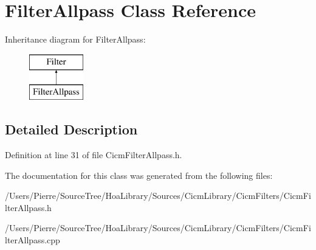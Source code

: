 \hypertarget{class_filter_allpass}{\section{Filter\-Allpass Class Reference}
\label{class_filter_allpass}
}
Inheritance diagram for Filter\-Allpass\-:\begin{figure}[H]
\begin{center}
\leavevmode
\includegraphics[height=2.000000cm]{class_filter_allpass}
\end{center}
\end{figure}


\subsection{Detailed Description}


Definition at line 31 of file Cicm\-Filter\-Allpass.\-h.



The documentation for this class was generated from the following files\-:\begin{DoxyCompactItemize}
\item 
/\-Users/\-Pierre/\-Source\-Tree/\-Hoa\-Library/\-Sources/\-Cicm\-Library/\-Cicm\-Filters/Cicm\-Filter\-Allpass.\-h\item 
/\-Users/\-Pierre/\-Source\-Tree/\-Hoa\-Library/\-Sources/\-Cicm\-Library/\-Cicm\-Filters/Cicm\-Filter\-Allpass.\-cpp\end{DoxyCompactItemize}
